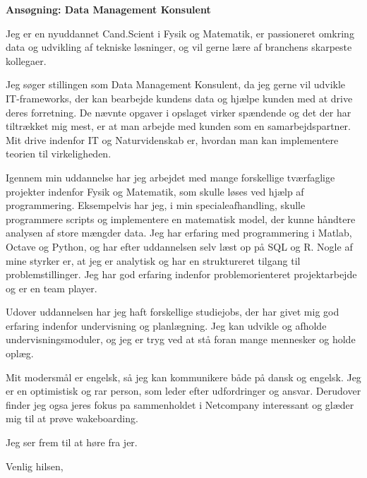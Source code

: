 \documentclass[10pt,a4paper]{letter}
\begin{document}
\begin{letter}{}
\opening{\textbf{Ansøgning: Data Management Konsulent}} 

Jeg er en nyuddannet Cand.Scient i Fysik og Matematik, er passioneret omkring data og udvikling af tekniske løsninger, og vil gerne lære af branchens skarpeste kollegaer. 

Jeg søger stillingen som Data Management Konsulent, da jeg gerne vil udvikle IT-frameworks, der kan bearbejde kundens data og hjælpe kunden med at drive deres forretning. De nævnte opgaver i opslaget virker spændende og det der har tiltrækket mig mest, er at man arbejde med kunden som en samarbejdspartner. Mit drive indenfor IT og Naturvidenskab er, hvordan man kan implementere teorien til virkeligheden.   


Igennem min uddannelse har jeg arbejdet med mange forskellige tværfaglige projekter indenfor Fysik og Matematik, som skulle løses ved hjælp af programmering. Eksempelvis har jeg, i min specialeafhandling, skulle programmere scripts og implementere en matematisk model, der kunne håndtere analysen af store mængder data. Jeg har erfaring med programmering i Matlab, Octave og Python, og har efter uddannelsen selv læst op på SQL og R. Nogle af mine styrker er, at jeg er analytisk og har en struktureret tilgang til problemstillinger. Jeg har god erfaring indenfor problemorienteret projektarbejde og er en team player. 
 
Udover uddannelsen har jeg haft forskellige studiejobs, der har givet mig god erfaring indenfor undervisning og planlægning. Jeg kan udvikle og afholde undervisningsmoduler, og jeg er tryg ved at stå foran mange mennesker og holde oplæg.

Mit modersmål er engelsk, så jeg kan kommunikere både på dansk og engelsk. Jeg er en optimistisk og rar person, som leder efter udfordringer og ansvar. Derudover finder jeg ogsa jeres fokus pa sammenholdet i Netcompany interessant og glæder mig til at prøve wakeboarding.

Jeg ser frem til at høre fra jer.
\closing{Venlig hilsen,}

\end{letter}
\end{document}
